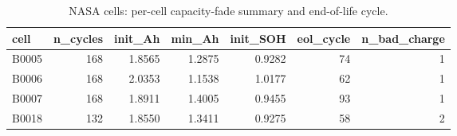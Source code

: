 \begin{table}
\caption{NASA cells: per-cell capacity-fade summary and end-of-life cycle.}
\label{tab:nasa_cell_summary}
\begin{tabular}{lrrrrrr}
\toprule
cell & n\_cycles & init\_Ah & min\_Ah & init\_SOH & eol\_cycle & n\_bad\_charge \\
\midrule
B0005 & 168 & 1.8565 & 1.2875 & 0.9282 & 74 & 1 \\
B0006 & 168 & 2.0353 & 1.1538 & 1.0177 & 62 & 1 \\
B0007 & 168 & 1.8911 & 1.4005 & 0.9455 & 93 & 1 \\
B0018 & 132 & 1.8550 & 1.3411 & 0.9275 & 58 & 2 \\
\bottomrule
\end{tabular}
\end{table}
